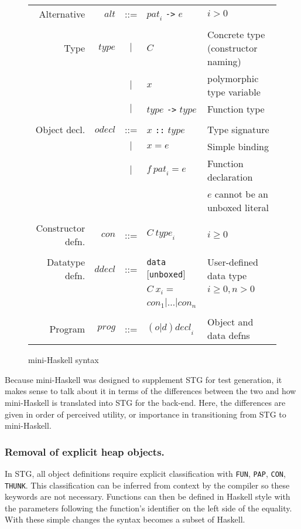 \documentclass{llncs}
\begin{document}
\begin{figure}
\begin{tabular}{r r c l l}
\\
Alternative        & $\mathit{alt}$      & ::= & $\mathit{pat}_i$ \texttt{->} $e$ & $i > 0$ \\
\\
Type               & $\mathit{type}$     & $|$ & $C$ & Concrete type (constructor naming) \\
                   &                     & $|$ & $x$ & polymorphic type variable \\
                   &                     & $|$ & $\mathit{type}$ \texttt{->} $\mathit{type}$ & Function type \\
\\
Object decl. & $\mathit{odecl}$    & ::= & $x$ \texttt{::} $\mathit{type}$ & Type signature \\
                   &                     & $|$ & $x = e$ & Simple binding \\
                   &                     & $|$ & $f\ \mathit{pat}_i = e$ & Function declaration \\
                   &                     &     & & $e$ cannot be an unboxed literal \\
\\
Constructor defn. & $\mathit{con}$  & ::= & $C\ \mathit{type}_i$ & $i \ge 0$ \\
\\
Datatype defn. &  $\mathit{ddecl}$ & ::= & \texttt{data} [\texttt{unboxed}] & User-defined data type  \\
               &                   &     & $C\ x_i =$                       & $i \ge 0, n > 0$         \\
               &                   &     & $\mathit{con}_1 | \dots |  \mathit{con}_n$ \\

\\
Program                & $\mathit{prog}$ & ::= & $\mathit{(o|d)decl}_i$ & Object and data defns
\end{tabular}
\caption{mini-Haskell syntax}
\label{fig:miniHaskell}
\end{figure}


Because mini-Haskell was designed to supplement STG for test generation, it
makes sense to talk about it in terms of the differences between the two and
how mini-Haskell is translated into STG for the back-end.  Here, the
differences are given in order of perceived utility, or importance in
transitioning from STG to mini-Haskell.

\subsubsection{Removal of explicit heap objects.}
In STG, all object definitions require explicit classification with
\texttt{FUN}, \texttt{PAP}, \texttt{CON}, \texttt{THUNK}. This classification can be
inferred from context by the compiler so these keywords are not necessary.
Functions can then be defined in Haskell style with the parameters following
the function's identifier on the left side of the equality. With these simple
changes the syntax becomes a subset of Haskell.
\end{document}
